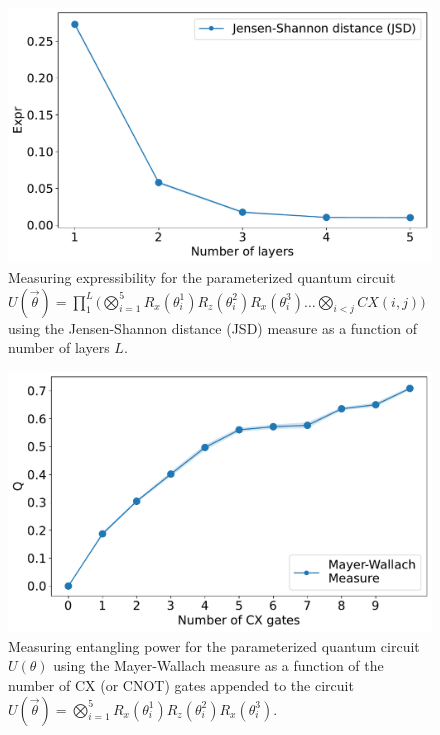 \begin{figure}[!t]
    \centering
    \includegraphics[width=\linewidth]{figures/qleet/expressibility-measure.pdf}
    \caption[Visualizing entanglement spectrum for parameterized quantum circuits]{Measuring expressibility for the parameterized quantum circuit $U(\vec{\theta}) =  \prod_{1}^{L}\big(\bigotimes_{i=1}^{5}R_x(\theta_i^1)R_z(\theta_i^2)R_x(\theta_i^3) \ldots \bigotimes_{i<j}CX(i, j)\big)$ using the Jensen-Shannon distance (JSD) measure as a function of number of layers $L$. }
    \label{fig:expressibility-measure}
\end{figure}

\begin{figure}[!t]
    \centering
    \includegraphics[width=\linewidth]{figures/qleet/entanglement-capability.pdf}
    \caption[Visualizing entanglement spectrum for parameterized quantum circuits]{Measuring entangling power for the parameterized quantum circuit $U(\theta)$ using the Mayer-Wallach measure as a function of the number of CX (or CNOT) gates appended to the circuit $U(\vec{\theta}) = \bigotimes_{i=1}^{5}R_x(\theta_i^1)R_z(\theta_i^2)R_x(\theta_i^3)$.}
    \label{fig:entanglement-capability}
\end{figure}

